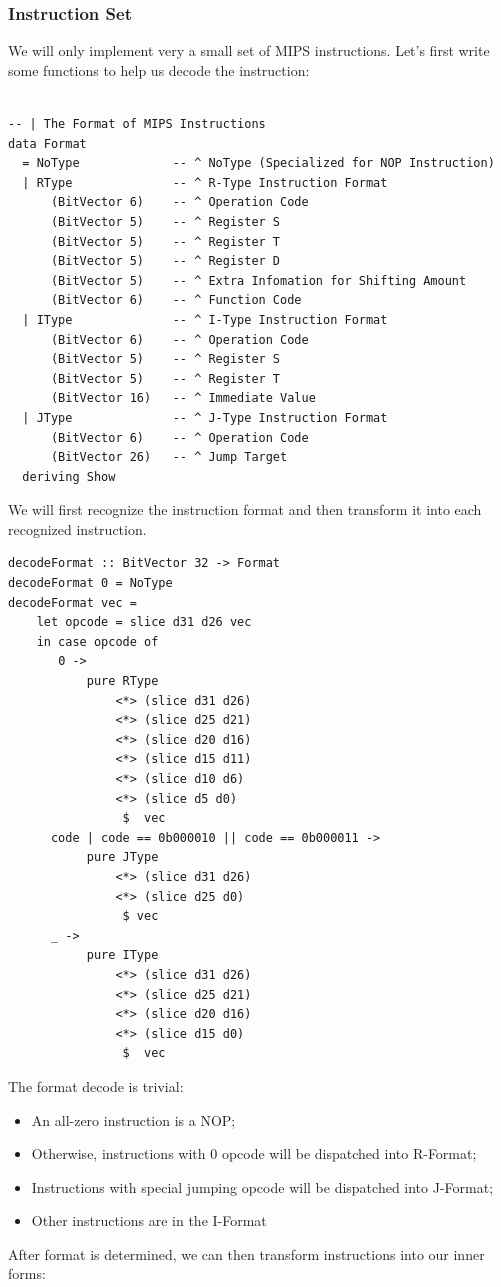 \documentclass[a4paper,12pt, oneside]{book}
\begin{document}
\subsubsection{Instruction Set}
We will only implement very a small set of MIPS instructions. Let's first write some functions to help us decode the instruction:
\begin{verbatim}

-- | The Format of MIPS Instructions
data Format            
  = NoType             -- ^ NoType (Specialized for NOP Instruction)
  | RType              -- ^ R-Type Instruction Format
      (BitVector 6)    -- ^ Operation Code
      (BitVector 5)    -- ^ Register S
      (BitVector 5)    -- ^ Register T
      (BitVector 5)    -- ^ Register D
      (BitVector 5)    -- ^ Extra Infomation for Shifting Amount
      (BitVector 6)    -- ^ Function Code
  | IType              -- ^ I-Type Instruction Format
      (BitVector 6)    -- ^ Operation Code
      (BitVector 5)    -- ^ Register S
      (BitVector 5)    -- ^ Register T
      (BitVector 16)   -- ^ Immediate Value
  | JType              -- ^ J-Type Instruction Format 
      (BitVector 6)    -- ^ Operation Code
      (BitVector 26)   -- ^ Jump Target
  deriving Show
\end{verbatim}
We will first recognize the instruction format and then transform it into each recognized instruction.
\begin{verbatim}
decodeFormat :: BitVector 32 -> Format
decodeFormat 0 = NoType
decodeFormat vec =
    let opcode = slice d31 d26 vec
    in case opcode of
       0 ->
           pure RType 
               <*> (slice d31 d26)
               <*> (slice d25 d21) 
               <*> (slice d20 d16) 
               <*> (slice d15 d11) 
               <*> (slice d10 d6) 
               <*> (slice d5 d0) 
                $  vec
      code | code == 0b000010 || code == 0b000011 ->
           pure JType 
               <*> (slice d31 d26) 
               <*> (slice d25 d0) 
                $ vec
      _ ->
           pure IType 
               <*> (slice d31 d26) 
               <*> (slice d25 d21) 
               <*> (slice d20 d16) 
               <*> (slice d15 d0) 
                $  vec
\end{verbatim}
The format decode is trivial:
\begin{itemize}
	\item An all-zero instruction is a NOP;
	\item Otherwise, instructions with 0 opcode will be dispatched into R-Format;
	\item Instructions with special jumping opcode will be dispatched into J-Format;
	\item Other instructions are in the I-Format
\end{itemize}
After format is determined, we can then transform instructions into our inner forms:
\end{document}

